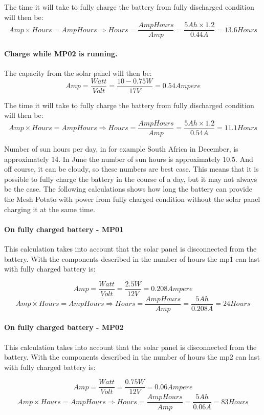 The time it will take to fully charge the battery from fully discharged condition will then be: 
$$Amp\times Hours = AmpHours \Rightarrow Hours =\frac{AmpHours}{Amp} = \frac{5 Ah\times 1.2}{0.44A} = 13.6 Hours$$

\paragraph{Charge while MP02 is running.}
The capacity from the solar panel will then be: 
$$Amp = \frac{Watt}{Volt} = \frac{10-0.75 W}{17 V} = 0.54 Ampere$$

The time it will take to fully charge the battery from fully discharged condition will then be: 
$$Amp\times Hours = AmpHours \Rightarrow Hours =\frac{AmpHours}{Amp} = \frac{5 Ah\times 1.2}{0.54A} = 11.1 Hours$$

Number of sun hours per day, in for example South Africa in December, is approximately 14. In June the number of sun hours is approximately 10.5. And off course, it can be cloudy, so these numbers are best case. This means that it is possible to fully charge the battery in the course of a day, but it may not always be the case. The following calculations shows how long the battery can provide the Mesh Potato with power from fully charged condition without the solar panel charging it at the same time. 

\paragraph{On fully charged battery - MP01}
This calculation takes into account that the solar panel is disconnected from the battery. With the components described in  the number of hours the \gls{mp1} can last with fully charged battery is: 

$$Amp = \frac{Watt}{Volt} = \frac{2.5 W}{12 V} = 0.208 Ampere$$
$$Amp\times Hours = AmpHours \Rightarrow Hours = \frac{AmpHours}{Amp} = \frac{5 Ah}{0.208 A} = 24 Hours$$

\paragraph{On fully charged battery - MP02}
This calculation takes into account that the solar panel is disconnected from the battery. With the components described in  the number of hours the \gls{mp2} can last with fully charged battery is: 

$$Amp = \frac{Watt}{Volt} = \frac{0.75 W}{12 V} = 0.06 Ampere$$
$$Amp\times Hours = AmpHours \Rightarrow Hours = \frac{AmpHours}{Amp} = \frac{5 Ah}{0.06 A} = 83 Hours$$


